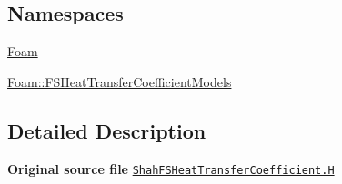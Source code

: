 \subsection*{Namespaces}
\begin{DoxyCompactItemize}
\item 
 \hyperlink{namespaceFoam}{Foam}
\item 
 \hyperlink{namespaceFoam_1_1FSHeatTransferCoefficientModels}{Foam\+::\+F\+S\+Heat\+Transfer\+Coefficient\+Models}
\end{DoxyCompactItemize}


\subsection{Detailed Description}
{\bfseries Original source file} \href{../../../home/carlo/data/GeN-Foam/GeN-Foam_ffn/GeN-Foam/GeN-Foam/classes/thermalHydraulics/src/physicsModels/heatTransferModels/FSHeatTransferCoefficientModels/Shah/ShahFSHeatTransferCoefficient.H}{\tt Shah\+F\+S\+Heat\+Transfer\+Coefficient.\+H} 
